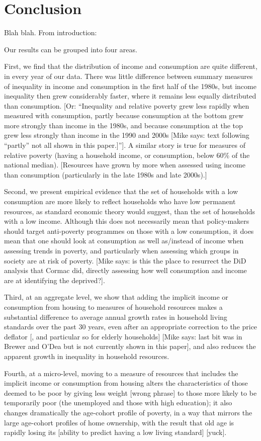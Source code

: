\section{Conclusion}\label{sec:conclusion}

Blah blah. From introduction:

Our results can be grouped into four areas. 

First, we find that the distribution of income and consumption are quite different, in every year of our data. There was little difference between summary measures of inequality in income and consumption in the first half of the 1980s, but income inequality then grew considerably faster, where it remains less equally distributed than consumption. [Or: ``Inequality and relative poverty grew less rapidly when measured with consumption, partly because consumption at the bottom grew more strongly than income in the 1980s, and because consumption at the top grew less strongly than income in the 1990 and 2000s [Mike says: text following "`partly"' not all shown in this paper.]'']. A similar story is true for measures of relative poverty (having a household income, or consumption, below 60\% of the national median). [Resources have grown by more when assessed using income than consumption (particularly in the late 1980s and late 2000s).]  

Second, we present empirical evidence that the set of households with a low consumption are more likely to reflect households who have low permanent resources, as standard economic theory would suggest, than the set of households with a low income. Although this does not necessarily mean that policy-makers should target anti-poverty programmes on those with a low consumption, it does mean that one should look at consumption as well as/instead of income when assessing trends in poverty, and particularly when assessing which groups in society are at risk of poverty. [Mike says: is this the place to resurrect the DiD analysis that Cormac did, directly assessing how well consumption and income are at identifying the deprived?]. 

Third, at an aggregate level, we show that adding the implicit income or consumption from housing to measures of household resources makes a substantial difference to average annual growth rates in household living standards over the past 30 years, even after an appropriate correction to the price deflator [, and particular so for elderly households] [Mike says: last bit was in Brewer and O'Dea but is not currently shown in this paper], and also reduces the apparent growth in inequality in household resources. 

Fourth, at a micro-level, moving to a measure of resources that includes 
the implicit income or consumption from housing alters the characteristics of those deemed to be poor by giving less weight [wrong phrase] to those more likely to be temporarily poor (the unemployed and those with high education); it also changes dramatically the age-cohort profile of poverty, in a way that mirrors the large age-cohort profiles of home ownership, with the result that old age is rapidly losing its [ability to predict having a low living standard] [yuck].